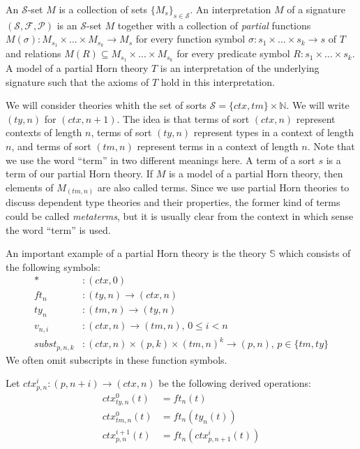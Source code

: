 \documentclass{mscs}
\newcommand{\emptyCtx}{*}
\newcommand{\substTh}{\mathbb{S}}
\numberwithin{figure}{section}
\begin{document}
An $\mathcal{S}$-set $M$ is a collection of sets $\{ M_s \}_{s \in \mathcal{S}}$.
An interpretation $M$ of a signature $(\mathcal{S},\mathcal{F},\mathcal{P})$ is an $\mathcal{S}$-set $M$
together with a collection of \emph{partial} functions $M(\sigma) : M_{s_1} \times \ldots \times M_{s_k} \to M_s$
for every function symbol $\sigma : s_1 \times \ldots \times s_k \to s$ of $T$
and relations $M(R) \subseteq M_{s_1} \times \ldots \times M_{s_k}$ for every predicate symbol $R : s_1 \times \ldots \times s_k$.
A model of a partial Horn theory $T$ is an interpretation of the underlying signature such that the axioms of $T$ hold in this interpretation.

We will consider theories whith the set of sorts $\mathcal{S} = \{ ctx, tm \} \times \mathbb{N}$.
We will write $(ty,n)$ for $(ctx,n+1)$.
The idea is that terms of sort $(ctx,n)$ represent contexts of length $n$,
terms of sort $(ty,n)$ represent types in a context of length $n$,
and terms of sort $(tm,n)$ represent terms in a context of length $n$.
Note that we use the word ``term'' in two different meanings here.
A term of a sort $s$ is a term of our partial Horn theory.
If $M$ is a model of a partial Horn theory, then elements of $M_{(tm,n)}$ are also called terms.
Since we use partial Horn theories to discuss dependent type theories and their properties, the former kind of terms could be called \emph{metaterms},
but it is usually clear from the context in which sense the word ``term'' is used.

An important example of a partial Horn theory is the theory $\substTh$ which consists of the following symbols:
\begin{align*}
\emptyCtx     & : (ctx,0) \\
ft_n          & : (ty,n) \to (ctx,n) \\
ty_n          & : (tm,n) \to (ty,n) \\
v_{n,i}       & : (ctx,n) \to (tm,n) \text{, } 0 \leq i < n \\
subst_{p,n,k} & : (ctx,n) \times (p,k) \times (tm,n)^k \to (p,n) \text{, } p \in \{ tm, ty \}
\end{align*}
We often omit subscripts in these function symbols.

Let $ctx^i_{p,n} : (p,n+i) \to (ctx,n)$ be the following derived operations:
\begin{align*}
ctx^0_{ty,n}(t) & = ft_n(t) \\
ctx^0_{tm,n}(t) & = ft_n(ty_n(t)) \\
ctx^{i+1}_{p,n}(t) & = ft_n(ctx^i_{p,n+1}(t))
\end{align*}
\end{document}
